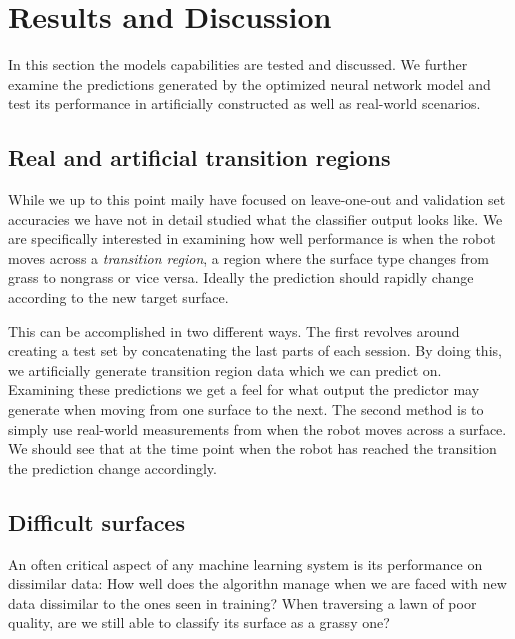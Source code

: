
\chapter{Results and Discussion}

In this section the models capabilities are tested and discussed. We further examine the predictions generated by the optimized neural network model and test its performance in artificially constructed as well as real-world scenarios. 

\section{Real and artificial transition regions}

While we up to this point maily have focused on leave-one-out and validation set accuracies we have not in detail studied what the classifier output looks like. We are specifically interested in examining how well performance is when the robot moves across a \emph{transition region}, a region where the surface type changes from grass to nongrass or vice versa. Ideally the prediction should rapidly change according to the new target surface. 

This can be accomplished in two different ways. The first revolves around creating a test set by concatenating the last parts of each session. By doing this, we artificially generate transition region data which we can predict on. Examining these predictions we get a feel for what output the predictor may generate when moving from one surface to the next. The second method is to simply use real-world measurements from when the robot moves across a surface. We should see that at the time point when the robot has reached the transition the prediction change accordingly. 

\section{Difficult surfaces}

An often critical aspect of any machine learning system is its performance on dissimilar data: How well does the algorithn manage when we are faced with new data dissimilar to the ones seen in training? When traversing a lawn of poor quality, are we still able to classify its surface as a grassy one?  















